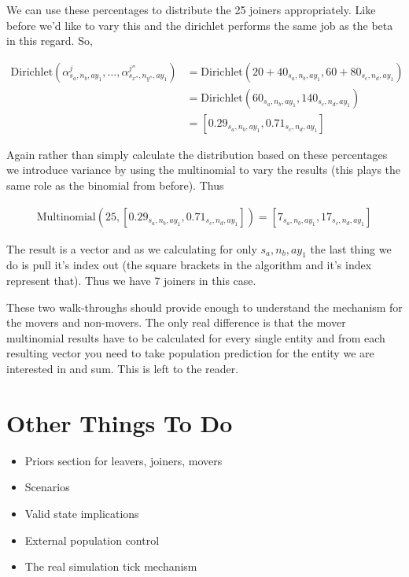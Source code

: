 \documentclass[margin=5mm]{article}
\begin{document}
We can use these percentages to distribute the 25 joiners
appropriately.  Like before we'd like to vary this and the dirichlet
performs the same job as the beta in this regard. So,

\begin{equation*}
  \begin{split}
\text{Dirichlet}(\alpha^{j}_{s_a,n_b,ay_1}, \dots,
\alpha^{j''}_{s_{x''},n_{y''},ay_{1}}) & =  \text{Dirichlet}(20 +
40_{s_a,n_b,ay_1}, 60 + 80_{s_c,n_d,ay_1}) \\
& = \text{Dirichlet}(60_{s_a,n_b,ay_1}, 140_{s_c,n_d,ay_1}) \\
& = [0.29_{s_a,n_b,ay_1}, 0.71_{s_c,n_d,ay_1}]
  \end{split}
\end{equation*}

Again rather than simply calculate the distribution based on these
percentages we introduce variance by using the multinomial to vary the
results (this plays the same role as the binomial from before).  Thus

\begin{equation*}
  \begin{split}
\text{Multinomial}(25, [0.29_{s_a,n_b,ay_1}, 0.71_{s_c,n_d,ay_1}]) = [
7_{s_a,n_b,ay_1}, 17_{s_c,n_d,ay_1}]
  \end{split}
\end{equation*}

The result is a vector and as we calculating for only ${s_a,n_b,ay_1}$
the last thing we do is pull it's index out (the square brackets in
the algorithm and it's index represent that).  Thus we have 7 joiners
in this case.

These two walk-throughs should provide enough to understand the
mechanism for the movers and non-movers.  The only real difference is
that the mover multinomial results have to be calculated for every
single entity and from each resulting vector you need to take
population prediction for the entity we are interested in and sum.
This is left to the reader.


\section{Other Things To Do}

\begin{itemize}
\item Priors section for leavers, joiners, movers
\item Scenarios
\item Valid state implications
\item External population control
\item The real simulation tick mechanism
\end{itemize}
\end{document}
